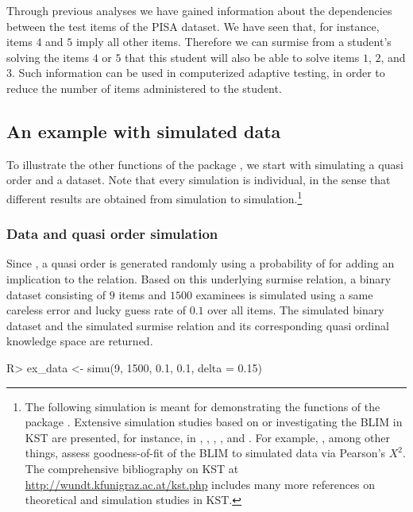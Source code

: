 \documentclass[nojss]{jss}
\begin{document}
Through previous analyses we have gained information about the dependencies between 
the test items of the PISA dataset. We have seen that, for instance, items $4$ and $5$ 
imply all other items. Therefore we can surmise from a student's solving the items $4$ or $5$
that this student will also be able to solve items $1$, $2$, and $3$. Such information can be used 
in computerized adaptive testing, in order to reduce the number of items 
administered to the student.

\subsection{An example with simulated data} 
\label{subsec:simu}

To illustrate the other functions of the package , we start with simulating a 
quasi order and a dataset. Note that every simulation is individual, in the sense that different results 
are obtained from simulation to simulation.\footnote{The following simulation is meant for demonstrating the functions 
of the package .
Extensive simulation studies based on or investigating the BLIM in KST are presented, for instance,
in \cite{SU:09}, \cite{Schrepp:03, S:05}, \cite{SR:09}, \cite{U:06}, and \cite{US:10}.
For example, \cite{SR:09}, among other things, assess goodness-of-fit 
of the BLIM to simulated data via Pearson's $X^2$.
The comprehensive bibliography on KST at \url{http://wundt.kfunigraz.ac.at/kst.php}
includes many more references on theoretical and simulation studies in KST.} 

\subsubsection{Data and quasi order simulation}

Since , a quasi order 
is generated randomly using a probability of  for adding an implication 
to the relation. Based on this underlying surmise relation, a binary dataset consisting of $9$ 
items and $1500$ examinees is simulated using a same careless error and lucky guess 
rate of $0.1$ over all items. The simulated binary dataset and the simulated surmise relation 
and its corresponding quasi ordinal knowledge space are returned.
\begin{Schunk}
\begin{Sinput}
R> ex_data <- simu(9, 1500, 0.1, 0.1, delta = 0.15)
\end{Sinput}
\end{Schunk}
\end{document}

